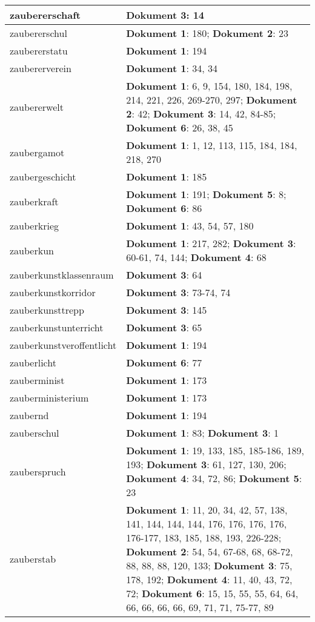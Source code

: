 \documentclass[a5paper]{article}
\begin{document}
\begin{longtable}[l]{|l|p{3in}|}
\hline
zaubererschaft & \textbf{Dokument 3}: 14 \\
\hline
zaubererschul & \textbf{Dokument 1}: 180; \textbf{Dokument 2}: 23 \\
\hline
zaubererstatu & \textbf{Dokument 1}: 194 \\
\hline
zaubererverein & \textbf{Dokument 1}: 34, 34 \\
\hline
zaubererwelt & \textbf{Dokument 1}: 6, 9, 154, 180, 184, 198, 214, 221, 226, 269-270, 297; \textbf{Dokument 2}: 42; \textbf{Dokument 3}: 14, 42, 84-85; \textbf{Dokument 6}: 26, 38, 45 \\
\hline
zaubergamot & \textbf{Dokument 1}: 1, 12, 113, 115, 184, 184, 218, 270 \\
\hline
zaubergeschicht & \textbf{Dokument 1}: 185 \\
\hline
zauberkraft & \textbf{Dokument 1}: 191; \textbf{Dokument 5}: 8; \textbf{Dokument 6}: 86 \\
\hline
zauberkrieg & \textbf{Dokument 1}: 43, 54, 57, 180 \\
\hline
zauberkun & \textbf{Dokument 1}: 217, 282; \textbf{Dokument 3}: 60-61, 74, 144; \textbf{Dokument 4}: 68 \\
\hline
zauberkunstklassenraum & \textbf{Dokument 3}: 64 \\
\hline
zauberkunstkorridor & \textbf{Dokument 3}: 73-74, 74 \\
\hline
zauberkunsttrepp & \textbf{Dokument 3}: 145 \\
\hline
zauberkunstunterricht & \textbf{Dokument 3}: 65 \\
\hline
zauberkunstveroffentlicht & \textbf{Dokument 1}: 194 \\
\hline
zauberlicht & \textbf{Dokument 6}: 77 \\
\hline
zauberminist & \textbf{Dokument 1}: 173 \\
\hline
zauberministerium & \textbf{Dokument 1}: 173 \\
\hline
zaubernd & \textbf{Dokument 1}: 194 \\
\hline
zauberschul & \textbf{Dokument 1}: 83; \textbf{Dokument 3}: 1 \\
\hline
zauberspruch & \textbf{Dokument 1}: 19, 133, 185, 185-186, 189, 193; \textbf{Dokument 3}: 61, 127, 130, 206; \textbf{Dokument 4}: 34, 72, 86; \textbf{Dokument 5}: 23 \\
\hline
zauberstab & \textbf{Dokument 1}: 11, 20, 34, 42, 57, 138, 141, 144, 144, 144, 176, 176, 176, 176, 176-177, 183, 185, 188, 193, 226-228; \textbf{Dokument 2}: 54, 54, 67-68, 68, 68-72, 88, 88, 88, 120, 133; \textbf{Dokument 3}: 75, 178, 192; \textbf{Dokument 4}: 11, 40, 43, 72, 72; \textbf{Dokument 6}: 15, 15, 55, 55, 64, 64, 66, 66, 66, 66, 69, 71, 71, 75-77, 89 \\

\end{longtable}
\end{document}
